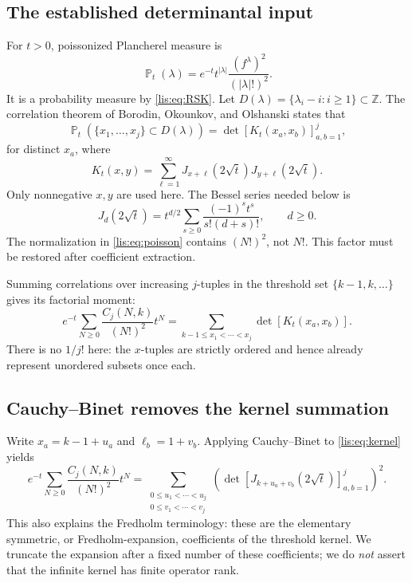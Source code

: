 \documentclass[11pt,letterpaper]{article}
\numberwithin{equation}{section}
\theoremstyle{definition}
\DeclareMathOperator{\Prob}{\mathbb P}
\newcommand{\Z}{\mathbb Z}
\begin{document}
\subsection{The established determinantal input}
For $t>0$, poissonized Plancherel measure is
\begin{equation}
 \Prob_t(\lambda)=e^{-t}t^{|\lambda|}
                 \frac{(f^\lambda)^2}{(|\lambda|!)^2}.
 \label{lis:eq:poisson}
\end{equation}
It is a probability measure by \eqref{lis:eq:RSK}. Let
$D(\lambda)=\{\lambda_i-i:i\ge1\}\subset\Z$.
The correlation theorem of Borodin, Okounkov, and Olshanski
\cite[Theorem 2 and Proposition 2.9]{BOO} states that
\begin{equation}
 \Prob_t(\{x_1,\ldots,x_j\}\subset D(\lambda))
       =\det[K_t(x_a,x_b)]_{a,b=1}^{j},\label{lis:eq:kernelcorr}
\end{equation}
for distinct $x_a$, where
\begin{equation}
 K_t(x,y)=\sum_{\ell=1}^{\infty}
       J_{x+\ell}(2\sqrt t)J_{y+\ell}(2\sqrt t).
 \label{lis:eq:kernel}
\end{equation}
Only nonnegative $x,y$ are used here. The Bessel series needed below is
\begin{equation}
 J_d(2\sqrt t)=t^{d/2}\sum_{s\ge0}
                  \frac{(-1)^st^s}{s!(d+s)!},\qquad d\ge0.
 \label{lis:eq:Bessel}
\end{equation}
The normalization in \eqref{lis:eq:poisson} contains $(N!)^2$, not $N!$.
This factor must be restored after coefficient extraction.

Summing correlations over increasing $j$-tuples in the threshold set
$\{k-1,k,\ldots\}$ gives its factorial moment:
\begin{equation}
 e^{-t}\sum_{N\ge0}\frac{C_j(N,k)}{(N!)^2}t^N
 =\sum_{k-1\le x_1<\cdots<x_j}
                     \det[K_t(x_a,x_b)].\label{lis:eq:momentgf}
\end{equation}
There is no $1/j!$ here: the $x$-tuples are strictly ordered and hence
already represent unordered subsets once each.

\subsection{Cauchy--Binet removes the kernel summation}
Write $x_a=k-1+u_a$ and $\ell_b=1+v_b$. Applying Cauchy--Binet to
\eqref{lis:eq:kernel} yields
\begin{equation}
 e^{-t}\sum_{N\ge0}\frac{C_j(N,k)}{(N!)^2}t^N
 =\sum_{\substack{0\le u_1<\cdots<u_j\\0\le v_1<\cdots<v_j}}
       \left(\det[J_{k+u_a+v_b}(2\sqrt t)]_{a,b=1}^{j}\right)^2.
 \label{lis:eq:squaredminors}
\end{equation}
This also explains the Fredholm terminology: these are the elementary
symmetric, or Fredholm-expansion, coefficients of the threshold kernel.
We truncate the expansion after a fixed number of these coefficients;
we do \emph{not} assert that the infinite kernel has finite operator rank.
\end{document}
